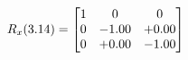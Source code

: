 \documentclass[preview]{standalone}
\begin{document}
\begin{align*}
\special{dvisvgm:raw <g id='unique000'>}R_{x}(3.14) = \begin{bmatrix}1 & 0 & 0 \\0 & -1.00 & +0.00 \\0 & +0.00 & -1.00\end{bmatrix}\special{dvisvgm:raw </g>}
\end{align*}
\end{document}
